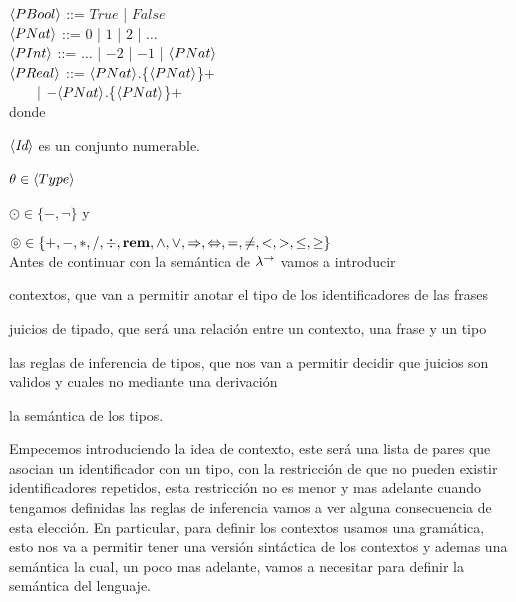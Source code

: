 \noindent
$\langle PBool \rangle$ ::= $True$ | $False$\\

\noindent
$\langle PNat \rangle$ ::= $0$ | $1$ | $2$ | $\ldots$\\

\noindent
$\langle PInt \rangle$ ::= $\ldots$ | $-2$ | $-1$ | $\langle PNat \rangle$\\

\noindent
$\langle PReal \rangle$ ::= $\langle PNat \rangle$.\{$\langle PNat \rangle$\}+\\
\indent \indent \ \ \ \
| $- \langle PNat \rangle$.\{$\langle PNat \rangle$\}+\\

\noindent
donde \ 

$\langle \textit{Id} \rangle$ es un conjunto numerable.

$\theta \in \langle Type \rangle$ \

$\odot \in \{-, \neg\}$ y \

$\circledcirc \in \{+,-,*,/,\div,\textbf{rem},\wedge,\vee,\Rightarrow,\Leftrightarrow, =,\neq,<,>,\leq,\geq\}$\\

Antes de continuar con la sem\'antica de $\lambda^{\rightarrow}$
vamos a introducir 
\begin{inparaenum}
\item contextos, que van a permitir anotar el tipo de los identificadores
de las frases
\item juicios de tipado, que ser\'a una relaci\'on entre un contexto, una frase y
un tipo
\item las reglas de inferencia de tipos, que nos van a permitir decidir que juicios
son validos y cuales no mediante una derivaci\'on
\item la sem\'antica de los tipos.\\
\end{inparaenum}

Empecemos introduciendo la idea de contexto, este ser\'a una lista 
de pares que asocian un identificador 
con un tipo, con la restricci\'on de que no pueden
existir identificadores repetidos, esta restricci\'on no es menor y mas
adelante cuando tengamos definidas las reglas de inferencia vamos a
ver alguna consecuencia de esta elecci\'on. En particular, para
definir los contextos usamos una gram\'atica, esto
nos va a permitir tener una versi\'on sint\'actica de los contextos
y ademas una sem\'antica la cual, un poco mas adelante, vamos a
necesitar para definir la sem\'antica del lenguaje.

